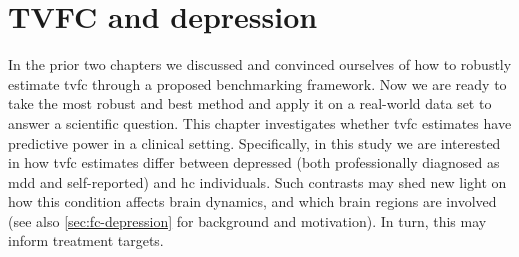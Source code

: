 \chapter{TVFC and depression}\label{ch:ukb}

In the prior two chapters we discussed and convinced ourselves of how to robustly estimate \gls{tvfc} through a proposed benchmarking framework.
Now we are ready to take the most robust and best method and apply it on a real-world data set to answer a scientific question.
%
This chapter investigates whether \gls{tvfc} estimates have predictive power in a clinical setting.
Specifically, in this study we are interested in how \gls{tvfc} estimates differ between depressed (both professionally diagnosed as \gls{mdd} and self-reported) and \gls{hc} individuals.
Such contrasts may shed new light on how this condition affects brain dynamics, and which brain regions are involved (see also \cref{sec:fc-depression} for background and motivation).
In turn, this may inform treatment targets.

